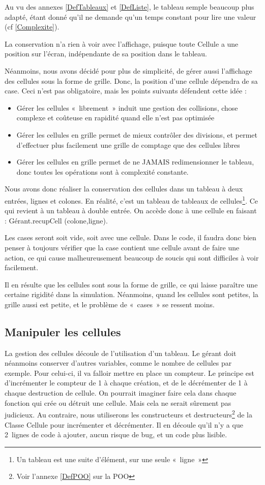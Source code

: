 Au vu des annexes \ref{DefTableaux} et \ref{DefListe}, le tableau semple beaucoup plus adapté, étant donné qu'il ne demande qu'un temps constant pour lire une valeur (cf \ref{Complexite}).

La conservation n'a rien à voir avec l'affichage, puisque toute Cellule a une position sur l'écran, indépendante de sa position dans le tableau.

Néanmoins, nous avons décidé pour plus de simplicité, de gérer aussi l'affichage des cellules sous la forme de grille. Donc, la position d'une cellule dépendra de sa case. Ceci n'est pas obligatoire, mais les points suivants défendent cette idée : 
\begin{itemize}
	\item Gérer les cellules «~librement~» induit une gestion des collisions, chose complexe et coûteuse en rapidité quand elle n'est pas optimisée
	\item Gérer les cellules en grille permet de mieux contrôler des divisions, et permet d'effectuer plus facilement une grille de comptage que des cellules libres 
	\item Gérer les cellules en grille permet de ne JAMAIS redimensionner le tableau, donc 
	toutes les opérations sont à complexité constante.
\end{itemize}

Nous avons donc réaliser la conservation des cellules dans un tableau à deux entrées, lignes et colones. En réalité, c'est un tableau de tableaux de cellules\footnote{Un tableau est une suite d'élément, sur une seule «~ligne~»}. Ce qui revient à un tableau à double entrée. On accède donc à une cellule en faisant : Gérant.recupCell (colone,ligne).

Les cases seront soit vide, soit avec une cellule. Dans le code, il faudra donc bien penser à toujours vérifier que la case contient une cellule avant de faire une action, ce qui cause malheureusement beaucoup de soucis qui sont difficiles à voir facilement.

Il en résulte que les cellules sont sous la forme de grille, ce qui laisse paraître une certaine rigidité dans la simulation. Néanmoins, quand les cellules sont petites, la grille aussi est petite, et le problème de «~cases~» se ressent moins.

\subsection{Manipuler les cellules}
	La gestion des cellules découle de l'utilisation d'un tableau. Le gérant doit néanmoins conserver d'autres variables, comme le nombre de cellules par exemple. Pour celui-ci, il va falloir mettre en place un compteur.
	Le principe est d'incrémenter le compteur de 1 à chaque création, et de le décrémenter de 1 à chaque destruction de cellule. On pourrait imaginer faire cela dans chaque fonction qui crée ou détruit une cellule. Mais cela ne serait sûrement pas judicieux. Au contraire, nous utiliserons les constructeurs et destructeurs\footnote{Voir l'annexe \ref{DefPOO} sur la POO} de la Classe Cellule pour incrémenter et décrémenter. Il en découle qu'il n'y a que 2 lignes de code à ajouter, aucun risque de bug, et un code plus lisible.
	
